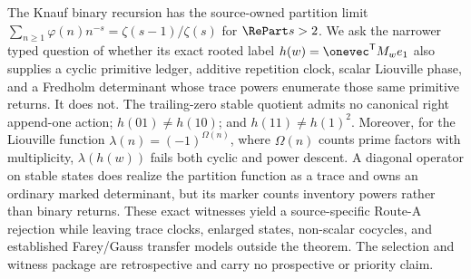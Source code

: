 The Knauf binary recursion has the source-owned partition limit
$\sum_{n\ge1}\varphi(n)n^{-s}=\zeta(s-1)/\zeta(s)$ for
$\RePart s>2$. We ask the narrower typed question of whether its exact rooted
label $h(w)=\onevec^{\mathsf T}M_we_1$ also supplies a cyclic primitive
ledger, additive repetition clock, scalar Liouville phase, and a Fredholm
determinant whose trace powers enumerate those same primitive returns. It
does not. The trailing-zero stable quotient admits no canonical right
append-one action; $h(01)\ne h(10)$; and $h(11)\ne h(1)^2$. Moreover, for
the Liouville function $\lambda(n)=(-1)^{\Omega(n)}$, where $\Omega(n)$
counts prime factors with multiplicity, $\lambda(h(w))$ fails both cyclic
and power descent. A diagonal operator on stable states does realize the partition
function as a trace and owns an ordinary marked determinant, but its marker
counts inventory powers rather than binary returns. These exact witnesses
yield a source-specific Route-A rejection while leaving trace clocks,
enlarged states, non-scalar cocycles, and established Farey/Gauss transfer
models outside the theorem. The selection and witness package are
retrospective and carry no prospective or priority claim.
